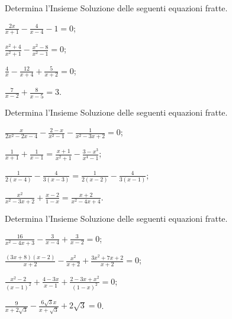 \begin{esercizio}[\Ast]
 \label{ese:3.50} %
Determina l'Insieme Soluzione delle seguenti equazioni fratte.
\begin{multicols}{2}
\begin{enumeratea}
\item $\frac{2 x}{x+1} - \frac{4}{x-4}-1= 0$;
\item $\frac{x^{2}+4}{x^{2}+1}-\frac{x^{2}-8}{x^{2}-1} = 0$;
\item $\frac{4}{x}-\frac{12}{x+4}+\frac{5}{x+2} = 0$;
\item $\frac{7}{x-2}+\frac{8}{x-5}=3$.
\end{enumeratea}
\end{multicols}
\end{esercizio}

\begin{esercizio}[\Ast]
 \label{ese:3.51} %
Determina l'Insieme Soluzione delle seguenti equazioni fratte.
\begin{multicols}{2}
\begin{enumeratea}
\item $\frac{x}{2x^{2}-2x-4} - \frac{2-x}{x^{2}-1}-\frac{1}{x^{2}-3x+2}= 0$;
\item $\frac{1}{x+1}+\frac{1}{x-1} = \frac{x+1}{x^{2}+1}-\frac{3-x^{3}}{x^{4}-1}$;
\item $\frac{1}{2(x-4)}-\frac{4}{3(x-3)} = \frac{1}{2(x-2)}-\frac{4}{3(x-1)}$;
\item $\frac{x^{2}}{x^{2}-3x+2}+\frac{x-2}{1-x} = \frac{x+2}{x^{2}-4x+4}$.
\end{enumeratea}
\end{multicols}
\end{esercizio}

\begin{esercizio}[\Ast]
 \label{ese:3.52} %
Determina l'Insieme Soluzione delle seguenti equazioni fratte.
\begin{multicols}{2}
\begin{enumeratea}
\item $\frac{16}{x^{2}-4x+3} - \frac{3}{x-4}+\frac{3}{x-2}= 0$;
\item $\frac{(3x+8)(x-2)}{x+2}-\frac{x^{2}}{x+2}+\frac{3x^{2}+7x+2}{x+2} = 0$;
\item $\frac{x^{2}-2}{(x-1)^{2}}+\frac{4-3x}{x-1}+\frac{2-3x+x^{2}}{(1-x)^{2}} = 0$;
\item $\frac{9}{x+2\sqrt{3}}-\frac{6\sqrt{3}x}{x+\sqrt{3}}+2\sqrt{3} = 0$.
\end{enumeratea}
\end{multicols}
\end{esercizio}

